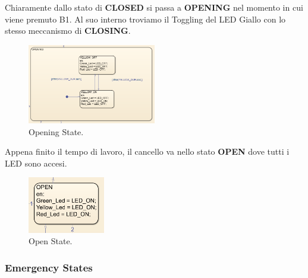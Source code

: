\documentclass[12pt]{article}
\begin{document}
\noindent Chiaramente dallo stato di \textbf{CLOSED} si passa a \textbf{OPENING} nel momento in cui viene premuto B1. Al suo interno troviamo il Toggling del LED Giallo con lo stesso meccanismo di \textbf{CLOSING}.

\begin{figure}[H]
    \centering
    \includegraphics[width=0.5\textwidth]{imm/Opening.png}
    \caption{Opening State.}
\end{figure}

\noindent Appena finito il tempo di lavoro, il cancello va nello stato \textbf{OPEN} dove tutti i LED sono accesi.

\begin{figure}[H]
    \centering
    \includegraphics[width=0.3\textwidth]{imm/Open.png}
    \caption{Open State.}
\end{figure}
\newpage

\subsubsection{Emergency States}
\end{document}
